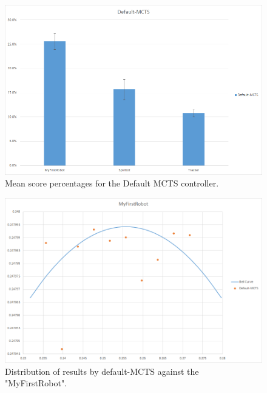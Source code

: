 \begin{figure}[htp]
\centerline{\includegraphics[width=\columnwidth]{Images/BarGraph}}
\caption{Mean score percentages for the Default MCTS controller.}
\label{figure-BarGraph}
\end{figure}

\begin{figure}[htp]
\centerline{\includegraphics[width=\columnwidth]{Images/MyFirstRobotDistribution}}
\caption{Distribution of results by default-MCTS against the "MyFirstRobot".}
\label{figure--Distribution-MFR}
\end{figure}

